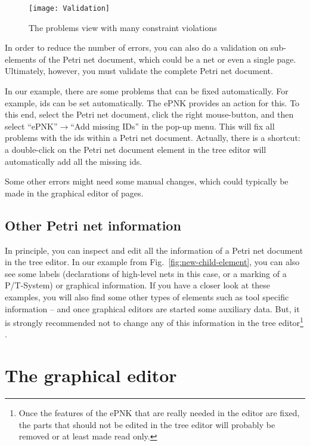 \begin{figure}[hbt!!]
  \centerline{\texttt{[image: Validation]}}
  \caption{The problems view with many constraint violations}
  \label{fig:validation}
\end{figure}

In order to reduce the number of errors, you can also do a validation
on sub-elements of the Petri net document, which could be a net
or even a single page. Ultimately, however, you must validate
the complete Petri net document.

In our example, there are some problems that
can be fixed automatically. For example, ids can be set automatically.
The ePNK provides an action for this. To this end, select the Petri net
document, click the right mouse-button, and then select
``ePNK''$\rightarrow$``Add missing IDs'' in the%
pop-up menu. This will fix all problems with the ids within a
Petri net document. Actually, there is a shortcut: a double-click
on the Petri net document element in the tree editor will automatically add all
the missing ids.

Some other errors might need some manual changes, which could typically
be made in the graphical editor of pages.

\subsection{Other Petri net information}

In principle, you can inspect and edit all the information of a Petri net
document in the tree editor. In our example from
Fig.~\ref{fig:new-child-element}, you can also see some labels (declarations
of high-level nets in this case, or a marking of a P/T-System) or
graphical information. If you have a closer look at these examples, you
will also find some other types of elements such as tool specific information --
and once graphical editors are started some auxiliary data.  But, it is
strongly recommended not to change any of this information in the tree
editor\footnote
 {Once the features of the ePNK that are really needed in the editor are fixed,
  the parts that should not be edited in the tree editor will probably be
  removed or at least made read only.}%
.%

\section{The graphical editor} 
\label{sec:graphical-editor}

